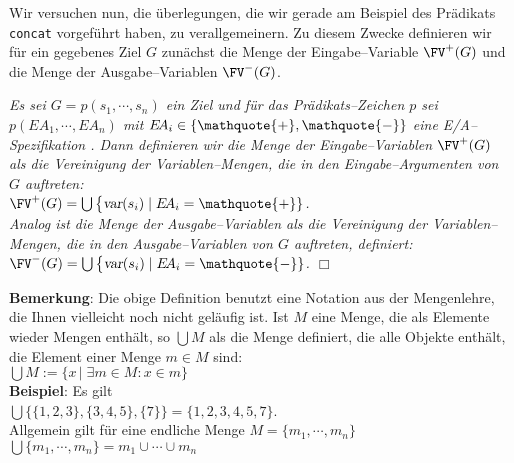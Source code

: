 Wir versuchen nun, die \"{u}berlegungen, die wir gerade am Beispiel des Pr\"{a}dikats \texttt{concat} vorgef\"{u}hrt haben,
zu verallgemeinern.  Zu diesem Zwecke definieren wir f\"{u}r ein gegebenes Ziel $G$ zun\"{a}chst die Menge der Eingabe--Variable
$\FV^+(G)$ und die Menge der Ausgabe--Variablen $\FV^-(G)$.

\begin{Definition}[$\FV^+(G)$, $\FV^-(G)$]
{\em
    Es sei $G = p(s_1,\cdots,s_n)$ ein Ziel und f\"{u}r das Pr\"{a}dikats--Zeichen $p$ sei $p(E\!A_1,\cdots,E\!A_n)$ mit $E\!A_i \in \{ \mathquote{+}, \mathquote{-} \}$ 
    eine E/A--Spezifikation . Dann definieren wir die Menge der \emph{Eingabe--Variablen}
    $\FV^+(G)$ als die Vereinigung der Variablen--Mengen, die in den Eingabe--Argumenten von $G$ auftreten: \\[0.1cm]
    \hspace*{1.3cm} $\FV^+(G) = \bigcup \big\{ \textsl{var}(s_i) \;|\; E\!A_i = \mathquote{+} \}$. \\[0.1cm]
    Analog ist die Menge der \emph{Ausgabe--Variablen} als die Vereinigung der Variablen--Mengen, 
    die in den Ausgabe--Variablen von $G$ auftreten, definiert: \\[0.1cm]
    \hspace*{1.3cm} $\FV^-(G) = \bigcup \big\{ \textsl{var}(s_i) \;|\; E\!A_i = \mathquote{-} \}$. 
    \hspace*{\fill} $\Box$
}
\end{Definition}

\noindent
\textbf{Bemerkung}: Die obige Definition benutzt eine Notation aus der Mengenlehre, die 
Ihnen vielleicht noch nicht gel\"{a}ufig ist.  Ist $M$ eine Menge, die als Elemente wieder Mengen enth\"{a}lt, 
so  $\bigcup M$ als die Menge definiert, die alle Objekte enth\"{a}lt, die Element einer Menge $m\in M$ sind: \\[0.1cm]
\hspace*{1.3cm} $\bigcup M := \{ x \,|\; \exists m \!\in\! M : x \!\in\! m \}$ \\[0.1cm]
\textbf{Beispiel}:  Es gilt \\[0.1cm]
\hspace*{1.3cm} $\bigcup \big\{ \{1,2,3\}, \{3,4,5\}, \{7\} \big\} = \{ 1,2,3,4,5,7\}$. \\[0.1cm]
Allgemein gilt f\"{u}r eine endliche Menge $M = \{ m_1 , \cdots, m_n \}$ \\[0.1cm]
\hspace*{1.3cm} $\bigcup \{ m_1 , \cdots, m_n \} = m_1 \cup \cdots \cup m_n$
\vspace{0.3cm}

